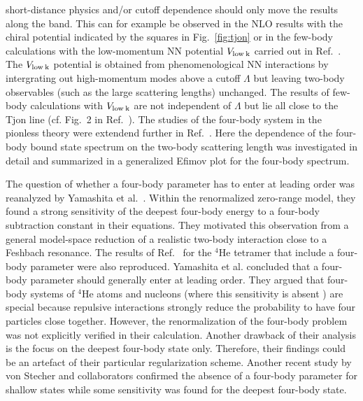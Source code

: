 \documentclass[aps,rmp,nofootinbib,twocolumn,floatfix]{revtex4}
\begin{document}
short-distance physics and/or cutoff dependence should only move 
the results along the band. This can for example be observed in
the NLO results with the chiral potential indicated by the squares
in Fig.~\ref{fig:tjon} or in
the few-body calculations with the low-momentum NN potential 
$V_{\rm low\: k}$ carried out in Ref.~\cite{Nogga:2004ab}. The 
$V_{\rm low\: k}$ potential
is obtained from phenomenological NN interactions by intergrating out 
high-momentum modes above a cutoff $\Lambda$
but leaving two-body observables (such as the large
scattering lengths) unchanged. The results of few-body calculations 
with $V_{\rm low\: k}$ are not independent of $\Lambda$ but lie all
close to the Tjon line (cf. Fig.~2 in Ref.~\cite{Nogga:2004ab}).
The studies of the four-body system in the pionless theory
were extendend further in Ref.~\cite{Hammer:2006ct}. Here the 
dependence of the four-body bound state spectrum on the two-body
scattering length was investigated in detail and summarized in a
generalized Efimov plot for the four-body spectrum.


The question of whether a four-body parameter has to enter at leading order
was reanalyzed by Yamashita et al.~\cite{Yama06}.
Within the renormalized zero-range model, they found a strong sensitivity
of the deepest four-body energy
to a four-body subtraction constant in their equations.
They motivated this observation from a general model-space reduction
of a realistic two-body interaction close to a Feshbach resonance.
The results of Ref.~\cite{Platter:2004qn} for the $^4$He tetramer
that include a four-body parameter were also reproduced. 
Yamashita et al. concluded that a four-body
parameter should generally enter at leading order. They argued that
four-body systems of $^4$He atoms and nucleons (where this sensitivity
is absent \cite{Platter:2004qn,Platter:2004zs,Nogga:2004ab})
are special because repulsive interactions strongly reduce
the probability to have four particles close together.
However, the renormalization of the four-body problem was not explicitly
verified in their calculation.
Another drawback of their analysis is the focus on the deepest four-body
state only. Therefore, their findings could be an artefact of
their particular regularization scheme. 
Another recent study by von Stecher and collaborators 
\cite{vStech08} confirmed the absence of a four-body parameter 
for shallow states while some sensitivity was found for the 
deepest four-body state.
\end{document}
